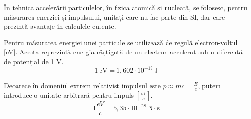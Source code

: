În tehnica accelerării particulelor, în fizica atomică și nucleară, se folosesc,
pentru măsurarea energiei și impulsului, unități care nu fac parte din SI, dar
care prezintă avantaje în calculele curente.

Pentru măsurarea energiei unei particule se utilizează de regulă electron-voltul
[eV]. Acesta reprezintă energia câștigată de un electron accelerat sub o
diferență de potențial de 1 V.
\[ 1 ~ \mathrm{eV} = 1,602\cdot10^{-19} ~ \mathrm{J} \]

Deoarece în domeniul extrem relativist impulsul este \( p \approx mc = \frac{E}{c} \),
putem introduce o unitate arbitrară pentru impuls $\left[\frac{eV}{c}\right]$.
\[ 1 \frac{eV}{c} = 5,35\cdot10^{-28} ~ \mathrm{N \cdot s} \]
